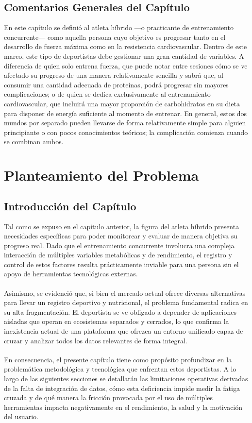 \documentclass[12pt]{article}
\begin{document}
\subsection{Comentarios Generales del Capítulo}
En este capítulo se definió al atleta híbrido ---o practicante de entrenamiento concurrente--- como aquella persona cuyo objetivo es progresar tanto en el desarrollo de fuerza máxima como en la resistencia cardiovascular. Dentro de este marco, este tipo de deportistas debe gestionar una gran cantidad de variables. A diferencia de quien solo entrena fuerza, que puede notar entre sesiones cómo se ve afectado su progreso de una manera relativamente sencilla y sabrá que, al consumir una cantidad adecuada de proteínas, podrá progresar sin mayores complicaciones; o de quien se dedica exclusivamente al entrenamiento cardiovascular, que incluirá una mayor proporción de carbohidratos en su dieta para disponer de energía suficiente al momento de entrenar. En general, estos dos mundos por separado pueden llevarse de forma relativamente simple para alguien principiante o con pocos conocimientos teóricos; la complicación comienza cuando se combinan ambos.
\newpage
\section{Planteamiento del Problema}
\subsection{Introducción del Capítulo}
Tal como se expuso en el capítulo anterior, la figura del atleta híbrido presenta necesidades específicas para poder monitorear y evaluar de manera objetiva su progreso real. Dado que el entrenamiento concurrente involucra una compleja interacción de múltiples variables metabólicas y de rendimiento, el registro y control de estos factores resulta prácticamente inviable para una persona sin el apoyo de herramientas tecnológicas externas.
\\\\
Asimismo, se evidenció que, si bien el mercado actual ofrece diversas alternativas para llevar un registro deportivo y nutricional, el problema fundamental radica en su alta fragmentación. El deportista se ve obligado a depender de aplicaciones aisladas que operan en ecosistemas separados y cerrados, lo que confirma la inexistencia actual de una plataforma que ofrezca un entorno unificado capaz de cruzar y analizar todos los datos relevantes de forma integral.
\\\\
En consecuencia, el presente capítulo tiene como propósito profundizar en la problemática metodológica y tecnológica que enfrentan estos deportistas. A lo largo de las siguientes secciones se detallarán las limitaciones operativas derivadas de la falta de integración de datos, cómo esta deficiencia impide medir la fatiga cruzada y de qué manera la fricción provocada por el uso de múltiples herramientas impacta negativamente en el rendimiento, la salud y la motivación del usuario.
\newpage
\end{document}
